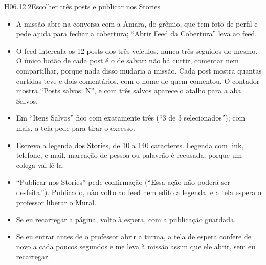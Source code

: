 \begin{historia}{H06.12.2}{Escolher três posts e publicar nos Stories}{\parcial}
\aceite
\begin{itemize}
  \item A missão abre na conversa com a Amara, do grêmio, que tem foto de
    perfil e pede ajuda para fechar a cobertura; \enquote{Abrir Feed da
    Cobertura} leva ao feed.
  \item O feed intercala os 12 posts dos três veículos, nunca três seguidos do
    mesmo. O único botão de cada post é o de salvar: não há curtir, comentar
    nem compartilhar, porque nada disso mudaria a missão. Cada post mostra
    quantas curtidas teve e dois comentários, com o nome de quem comentou. O
    contador mostra \enquote{Posts salvos: N}, e com três salvos aparece o
    atalho para a aba Salvos.
  \item Em \enquote{Itens Salvos} fico com exatamente três (\enquote{3 de 3
    selecionados}); com mais, a tela pede para tirar o excesso.
  \item Escrevo a legenda dos Stories, de 10 a 140 caracteres. Legenda com
    link, telefone, e-mail, marcação de pessoa ou palavrão é recusada, porque um
    colega vai lê-la.
  \item \enquote{Publicar nos Stories} pede confirmação (\enquote{Essa ação não
    poderá ser desfeita.}). Publicado, não volto ao feed nem edito a legenda, e
    a tela espera o professor liberar o Mural.
  \item Se eu recarregar a página, volto à espera, com a publicação guardada.
  \item Se eu entrar antes de o professor abrir a turma, a tela de espera
    confere de novo a cada poucos segundos e me leva à missão assim que ele
    abrir, sem eu recarregar.
\end{itemize}
\end{historia}

